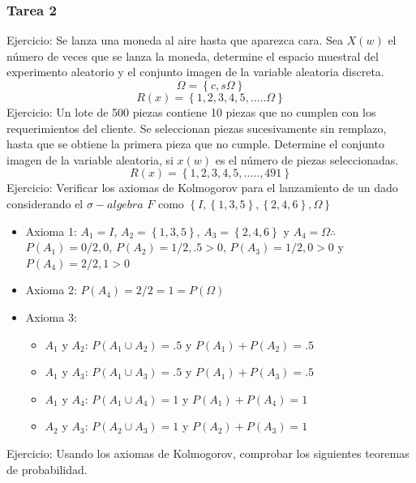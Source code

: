 \documentclass[11pt,fleqn]{book} %
\numberwithin{equation}{section} %
\numberwithin{figure}{section} %
\numberwithin{table}{section} %
\begin{document}
\subsubsection{Tarea 2}
Ejercicio: Se lanza una moneda al aire hasta que aparezca cara. Sea $X(w)$ el número de veces que se lanza la moneda, determine el espacio muestral del experimento aleatorio y el conjunto imagen de la variable aleatoria discreta.
$$ \Omega = \left\{ c,s \Omega \right\} $$
$$ R(x) = \left\{ 1,2,3,4,5,..... \Omega \right\} $$
Ejercicio: Un lote de 500 piezas contiene 10 piezas que no cumplen con los requerimientos del cliente. Se seleccionan piezas sucesivamente sin remplazo, hasta que se obtiene la primera pieza que no cumple. Determine el conjunto imagen de la variable aleatoria, si $x(w)$ es el número de piezas seleccionadas.
$$ R(x) = \left\{ 1,2,3,4,5,.....,491 \right\} $$
Ejercicio: Verificar los axiomas de Kolmogorov para el lanzamiento de un dado considerando el $\sigma-algebra $ $F$ como $\left\{ I,\left\{ 1,3,5  \right\}, \left\{ 2,4,6  \right\}, \Omega  \right\} $
\begin{itemize}
    \item Axioma 1: $A_{1} = I$, $A_{2} = \left\{ 1,3,5  \right\}$, $A_{3} = \left\{ 2,4,6  \right\}$ y $A_{4} = \Omega \therefore$\\ 
    $P(A_{1}) = 0/2, 0 $, $P(A_{2}) = 1/2 , .5 > 0$, $P(A_{3}) = 1/2, 0 > 0$ y $P(A_{4}) = 2/2, 1 > 0$
    \item Axioma 2: $P(A_{4}) = 2/2= 1 = P(\Omega)$
    \item Axioma 3:
    \begin{itemize}
        \item $A_{1}$ y $A_{2}$: $P(A_{1} \cup A_{2}) = .5$ y $P(A_{1}) + P(A_{2}) = .5$
        \item $A_{1}$ y $A_{3}$: $P(A_{1} \cup A_{3}) = .5$ y $P(A_{1}) + P(A_{3}) = .5$
        \item $A_{1}$ y $A_{4}$: $P(A_{1} \cup A_{4}) = 1$ y $P(A_{1}) + P(A_{4}) = 1$
        \item $A_{2}$ y $A_{3}$: $P(A_{2} \cup A_{3}) = 1$ y $P(A_{2}) + P(A_{3}) = 1$
    \end{itemize}
\end{itemize}
Ejercicio: Usando los axiomas de Kolmogorov, comprobar los siguientes teoremas de probabilidad.
\end{document}
